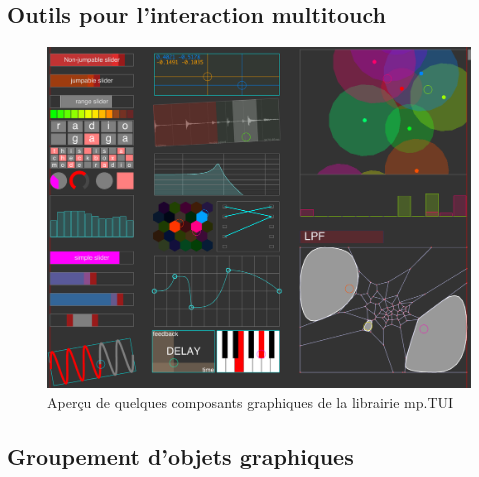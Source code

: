 \subsection{Outils pour l'interaction multitouch}

\begin{figure}[!htbp]
	\includegraphics[width=\textwidth]{gfx/mpTUI/mp-TUI-preview.png}
	\caption{Aperçu de quelques composants graphiques de la librairie mp.TUI}
	\label{fig:visual_representation:mp.TUI}
\end{figure}



\subsection{Groupement d'objets graphiques}

